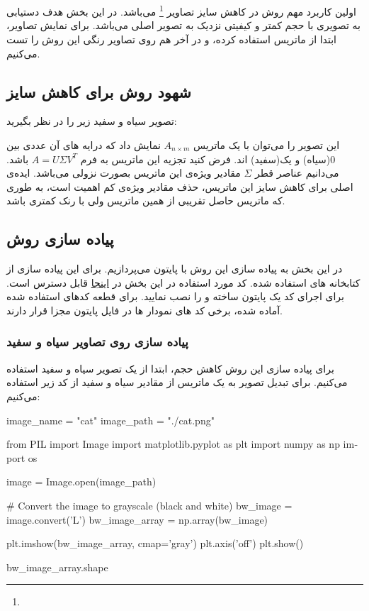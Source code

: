 \chapter{}
اولین کاربرد مهم روش
در کاهش سایز تصاویر
\footnote{
}
می‌باشد.
در این بخش هدف دستیابی به تصویری با حجم کمتر و کیفیتی نزدیک به تصویر اصلی می‌باشد.
برای نمایش تصاویر، ابتدا از ماتریس‌
استفاده کرده، و در آخر هم روی تصاویر رنگی این روش را تست می‌کنیم.


\section{شهود روش  برای کاهش سایز}
تصویر سیاه و سفید زیر را در نظر بگیرید:

این تصویر را می‌توان با یک ماتریس
$A_{n \times m}$
نمایش داد که درایه های آن عددی بین 0(سیاه) و یک(سفید) اند.
فرض کنید تجزیه
این ماتریس به فرم
$A=U \Sigma V^T$
باشد.
می‌دانیم
عناصر قطر
$\Sigma$
مقادیر ویژه‌ی این ماتریس
بصورت نزولی می‌باشد.
ایده‌ی اصلی
برای کاهش سایز این ماتریس،
حذف مقادیر ویژه‌ی کم اهمیت است، به طوری که ماتریس حاصل تقریبی از همین ماتریس ولی با رنک کمتری باشد.



\section{پیاده سازی روش}
در این بخش به پیاده سازی این روش با پایتون می‌پردازیم. برای این پیاده سازی از کتابخانه های
استفاده شده.
کد مورد استفاده در این بخش در
\href{https://github.com/atrin-hojjat/svd-image-processing}{اینجا}
قابل دسترس است. برای اجرای کد یک
پایتون ساخته و
را نصب نمایید.
برای قطعه کد‌های استفاده شده
آماده شده، برخی کد های نمودار ها در فایل پایتون مجزا قرار دارند.



\subsection{پیاده سازی روی تصاویر سیاه و سفید}
برای پیاده سازی این روش کاهش حجم، ابتدا از یک تصویر سیاه و سفید استفاده می‌کنیم. برای تبدیل تصویر به یک ماتریس از مقادیر سیاه و سفید از کد زیر استفاده می‌کنیم:

\begin{latin}
  \begin{python}
image_name = "cat"
image_path = "./cat.png"

from PIL import Image
import matplotlib.pyplot as plt
import numpy as np
import os

image = Image.open(image_path)

# Convert the image to grayscale (black and white)
bw_image = image.convert('L')
bw_image_array = np.array(bw_image)

plt.imshow(bw_image_array, cmap='gray')
plt.axis('off')
plt.show()

bw_image_array.shape
  \end{python}
\end{latin}

